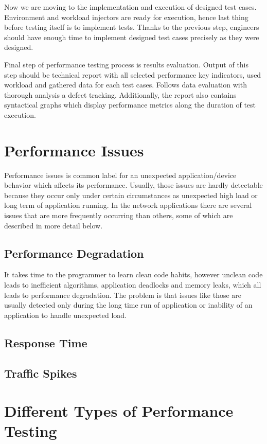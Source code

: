 Now we are moving to the implementation and execution of designed test cases. Environment and workload injectors are ready for execution, hence last thing before testing itself is to implement tests. Thanks to the previous step, engineers should have enough time to implement designed test cases precisely as they were designed. 

Final step of performance testing process is results evaluation. Output of this step should be technical report with all selected performance key indicators, used workload and gathered data for each test cases. Follows data evaluation with thorough analysis a defect tracking. Additionally, the report also contains syntactical graphs which display performance metrics along the duration of test execution.

\section{Performance Issues}
\label{Performance Issues}
Performance issues is common label for an unexpected application/device behavior which affects its performance. Usually, those issues are hardly detectable because they occur only under certain circumstances as unexpected high load or long term of application running. In the network applications there are several issues that are more frequently occurring  than others, some of which are described in more detail below.

\subsection{Performance Degradation}
It takes time to the programmer to learn clean code habits, however unclean code leads to inefficient algorithms, application deadlocks and memory leaks, which all leads to performance degradation. The problem is that issues like those are usually detected only during the long time run of application or inability of an application to handle unexpected load.


\subsection{Response Time}

\subsection{Traffic Spikes}

\section{Different Types of Performance Testing}
\label{Different Types of Performance Testing}

